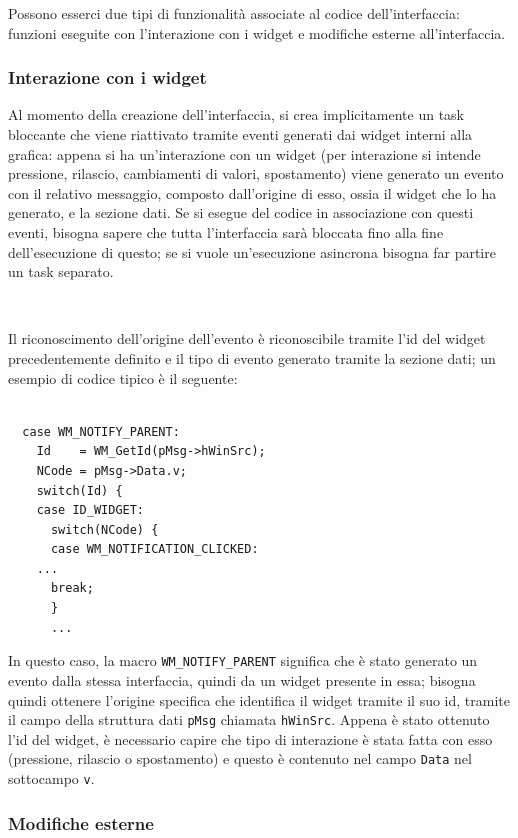 \documentclass[a4paper,titlepage]{book}
\newcommand{\code}{\lstinline}
\begin{document}
Possono esserci due tipi di funzionalità associate al codice dell'interfaccia: funzioni eseguite con l'interazione con i widget e modifiche esterne all'interfaccia.

\subsubsection{Interazione con i widget}

Al momento della creazione dell'interfaccia, si crea implicitamente un task bloccante che viene riattivato tramite eventi generati dai widget interni alla grafica: appena si ha un'interazione con un widget (per interazione si intende pressione, rilascio, cambiamenti di valori, spostamento) viene generato un evento con il relativo messaggio, composto dall'origine di esso, ossia il widget che lo ha generato, e la sezione dati. Se si esegue del codice in associazione con questi eventi, bisogna sapere che tutta l'interfaccia sarà bloccata fino alla fine dell'esecuzione di questo; se si vuole un'esecuzione asincrona bisogna far partire un task separato.

~

Il riconoscimento dell'origine dell'evento è riconoscibile tramite l'id del widget precedentemente definito e il tipo di evento generato tramite la sezione dati; un esempio di codice tipico è il seguente:

\begin{lstlisting}

  case WM_NOTIFY_PARENT:
    Id    = WM_GetId(pMsg->hWinSrc);
    NCode = pMsg->Data.v;
    switch(Id) {
    case ID_WIDGET:
      switch(NCode) {
      case WM_NOTIFICATION_CLICKED:
	...
      break;
      }
      ...

\end{lstlisting} 

In questo caso, la macro \code!WM_NOTIFY_PARENT! significa che è stato generato un evento dalla stessa interfaccia, quindi da un widget presente in essa; bisogna quindi ottenere l'origine specifica che identifica il widget tramite il suo id, tramite il campo della struttura dati \code!pMsg! chiamata \code!hWinSrc!. Appena è stato ottenuto l'id del widget, è necessario capire che tipo di interazione è stata fatta con esso (pressione, rilascio o spostamento) e questo è contenuto nel campo \code!Data! nel sottocampo \code!v!.

\subsubsection{Modifiche esterne}
\end{document}
